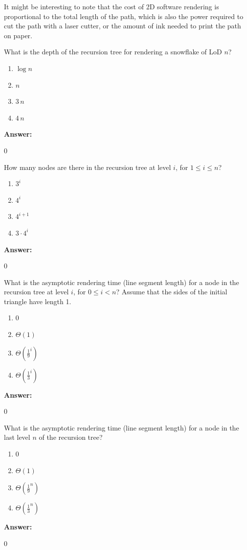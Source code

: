 \documentclass[12pt,twoside]{article}
\newcommand{\answer}{
 \par\medskip
 \textbf{Answer:}
}
\newcommand{\answerIm}{ \answer
0
}
\newcommand{\answerIn}{ \answer
0
}
\newcommand{\answerIo}{ \answer
0
}
\newcommand{\answerIp}{ \answer
0
}
\begin{document}
\begin{problems}
It might be interesting to note that the cost of 2D software rendering is
proportional to the total length of the path, which is also the power required
to cut the path with a laser cutter, or the amount of ink needed to print the
path on paper.

\begin{problemparts}
  \problempart {} What is the depth of the recursion tree for rendering a
  snowflake of LoD $n$?
    \begin{enumerate}
      \item $\log n$
      \item $n$
      \item $3 \, n$
      \item $4 \, n$
    \end{enumerate}
\answerIm

  \problempart {} How many nodes are there in the recursion tree at level
  $i$, for $1 \le i \le n$?
    \begin{enumerate}
      \item $3 ^ i$
      \item $4 ^ i$
      \item $4 ^ {i + 1}$
      \item $3 \cdot 4 ^ i$
    \end{enumerate}
\answerIn

  \problempart {} What is the asymptotic rendering time (line segment length)
  for a node in the recursion tree at level $i$, for $0 \le i < n$? Assume that
  the sides of the initial triangle have length 1.
    \begin{enumerate}
      \item $0$
      \item $\Theta(1)$
      \item $\Theta(\frac{1}{9}^i)$
      \item $\Theta(\frac{1}{3}^i)$
    \end{enumerate}
\answerIo

  \problempart {} What is the asymptotic rendering time (line segment length)
  for a node in the last level $n$ of the recursion tree?
    \begin{enumerate}
      \item $0$
      \item $\Theta(1)$
      \item $\Theta(\frac{1}{9}^n)$
      \item $\Theta(\frac{1}{3}^n)$
    \end{enumerate}
\answerIp


\end{problemparts}
\end{problems}
\end{document}
